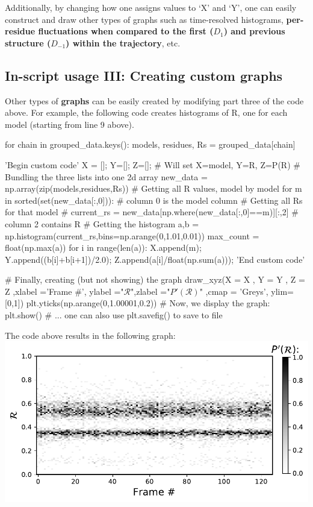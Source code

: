 \documentclass[fleqn,10pt,lineno]{wlpeerj} %
\newcommand{\n}[1]{{\textbf{\color{red}#1}}}
\begin{document}
\begin{enumerate}
Additionally, by changing how one assigns values to `X' and `Y', 
one can easily construct and draw other types of graphs such as time-resolved histograms, 
\n{per-residue fluctuations when compared to the first ($D_{1}$) and previous structure ($D_{-1}$) within the trajectory}, etc. 
\end{enumerate}

\subsection*{In-script usage III: Creating custom graphs}
Other types of \n{graphs} can be easily created by modifying part three of the code above. 
For example, the following code creates histograms of R, one for each model (starting from line 9 above).
\begin{python}[firstnumber=9]
	for chain in grouped_data.keys():
		models, residues, Rs = grouped_data[chain]
		
		'Begin custom code'
		X = []; Y=[]; Z=[]; # Will set X=model, Y=R, Z=P(R)
		# Bundling the three lists into one 2d array
		new_data =  np.array(zip(models,residues,Rs))
		# Getting all R values, model by model
		for m in sorted(set(new_data[:,0])): # column 0 is the model column
			# Getting all Rs for that model #
			current_rs = new_data[np.where(new_data[:,0]==m)][:,2] # column 2 contains R
			# Getting the histogram
			a,b = np.histogram(current_rs,bins=np.arange(0,1.01,0.01))
			max_count = float(np.max(a))
			for i in range(len(a)):
				X.append(m); Y.append((b[i]+b[i+1])/2.0); Z.append(a[i]/float(np.sum(a)));
		'End custom code'
		
		# Finally, creating (but not showing) the graph 
		draw_xyz(X = X       ,      Y = Y  ,                Z = Z
		   ,xlabel ='Frame #', ylabel ="$\mathcal{R}$",zlabel ="$P'(\mathcal{R})$"
			 ,cmap = 'Greys', ylim=[0,1])
		plt.yticks(np.arange(0,1.00001,0.2))
		# Now, we display the graph:
		plt.show() # ... one can also use plt.savefig() to save to file
\end{python}
The code above results in the following graph:\\
\includegraphics[width=0.5\linewidth]{backmap_figB.pdf}
\end{document}
